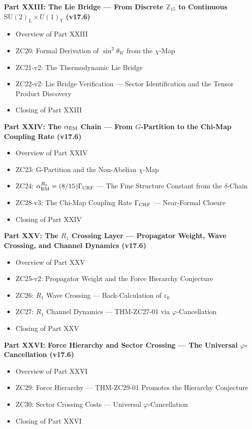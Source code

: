 \documentclass[11pt, a4paper]{article}
\begin{document}
\begin{contentsbox}[title={Part D --- Part and Section Headers}]
\textbf{Part XXIII: The Lie Bridge --- From Discrete $\mathbb{Z}_{15}$ to Continuous $\mathrm{SU}(2)_L \times U(1)_Y$ (v17.6)}
\begin{itemize}[noitemsep,leftmargin=1.5em]
  \item Overview of Part XXIII
  \item ZC20: Formal Derivation of $\sin^2\theta_W$ from the $\chi$-Map
  \item ZC21-v2: The Thermodynamic Lie Bridge
  \item ZC22-v2: Lie Bridge Verification --- Sector Identification and the Tensor Product Discovery
  \item Closing of Part XXIII
\end{itemize}

\textbf{Part XXIV: The $\alpha_{\rm EM}$ Chain --- From $G$-Partition to the Chi-Map Coupling Rate (v17.6)}
\begin{itemize}[noitemsep,leftmargin=1.5em]
  \item Overview of Part XXIV
  \item ZC23: G-Partition and the Non-Abelian $\chi$-Map
  \item ZC24: $\alpha_{\rm EM}^{R_0} = (8/15)\Gamma_{\rm CRF}$ --- The Fine Structure Constant from the $\delta$-Chain
  \item ZC28-v3: The Chi-Map Coupling Rate $\Gamma_{\rm CRF}$ --- Near-Formal Closure
  \item Closing of Part XXIV
\end{itemize}

\textbf{Part XXV: The $R_1$ Crossing Layer --- Propagator Weight, Wave Crossing, and Channel Dynamics (v17.6)}
\begin{itemize}[noitemsep,leftmargin=1.5em]
  \item Overview of Part XXV
  \item ZC25-v2: Propagator Weight and the Force Hierarchy Conjecture
  \item ZC26: $R_1$ Wave Crossing --- Back-Calculation of $\varepsilon_0$
  \item ZC27: $R_1$ Channel Dynamics --- THM-ZC27-01 via $\varphi$-Cancellation
  \item Closing of Part XXV
\end{itemize}

\textbf{Part XXVI: Force Hierarchy and Sector Crossing --- The Universal $\varphi$-Cancellation (v17.6)}
\begin{itemize}[noitemsep,leftmargin=1.5em]
  \item Overview of Part XXVI
  \item ZC29: Force Hierarchy --- THM-ZC29-01 Promotes the Hierarchy Conjecture
  \item ZC30: Sector Crossing Costs --- Universal $\varphi$-Cancellation
  \item Closing of Part XXVI
\end{itemize}


\end{contentsbox}
\end{document}
